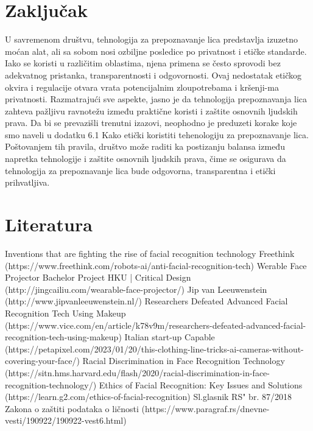 \documentclass{article}
\begin{document}
\newpage
\section{Zaključak}
U savremenom društvu, tehnologija za prepoznavanje lica predstavlja izuzetno moćan alat, ali sa sobom nosi ozbiljne posledice po privatnost i etičke standarde. Iako se koristi u različitim oblastima, njena primena se često sprovodi bez adekvatnog pristanka, transparentnosti i odgovornosti. Ovaj nedostatak etičkog okvira i regulacije otvara vrata potencijalnim zloupotrebama i kršenji-ma privatnosti.
\newline
\newline
Razmatrajući sve aspekte, jasno je da tehnologija prepoznavanja lica zahteva pažljivu ravnotežu između praktične koristi i zaštite osnovnih ljudskih prava. Da bi se prevazišli trenutni izazovi, neophodno je preduzeti korake koje smo naveli u dodatku 6.1 Kako etički koristiti tehenologiju za prepoznavanje lica.
\newline
\newline
Poštovanjem tih pravila, društvo može raditi ka postizanju balansa između napretka tehnologije i zaštite osnovnih ljudskih prava, čime se osigurava da tehnologija za prepoznavanje lica bude odgovorna, transparentna i etički prihvatljiva.
\newpage

\section{Literatura}
\begin{enumerate}
  \setcounter{enumi}{0}
  \renewcommand{\labelenumi}{[\arabic{enumi}]}
  
  Inventions that are fighting the rise of facial recognition technology Freethink (https://www.freethink.com/robots-ai/anti-facial-recognition-tech)
   Werable Face Projector Bachelor Project HKU | Critical Design (http://jingcailiu.com/wearable-face-projector/)
   Jip van Leeuwenstein (http://www.jipvanleeuwenstein.nl/)
   Researchers Defeated Advanced Facial Recognition Tech Using Makeup (https://www.vice.com/en/article/k78v9m/researchers-defeated-advanced-facial-recognition-tech-using-makeup)
   Italian start-up Capable (https://petapixel.com/2023/01/20/this-clothing-line-tricks-ai-cameras-without-covering-your-face/)
   Racial Discrimination in Face Recognition Technology (https://sitn.hms.harvard.edu/flash/2020/racial-discrimination-in-face-recognition-technology/)
   Ethics of Facial Recognition: Key Issues and Solutions (https://learn.g2.com/ethics-of-facial-recognition)
   Sl.glasnik RS" br. 87/2018 Zakona o zaštiti podataka o ličnosti (https://www.paragraf.rs/dnevne-vesti/190922/190922-vest6.html)
\end{enumerate}
\newpage
\end{document}
